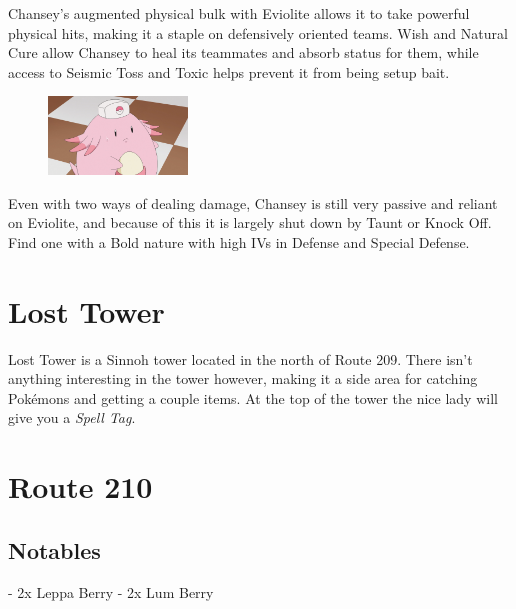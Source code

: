 \documentclass[11pt]{article}
\begin{document}
\begin{mdframed}[style=MyFrame,nobreak=true,frametitle={Pokemon Spotlight: Chansey}]

Chansey's augmented physical bulk with Eviolite allows it to take powerful physical hits,
making it a staple on defensively oriented teams.
Wish and Natural Cure allow Chansey to heal its teammates and absorb status for them,
while access to Seismic Toss and Toxic helps prevent it from being setup bait.

\begin{figure}
\includegraphics[width=0.33\textwidth]{walkthrough/Sinnoh/spotlight-chansey}
\label{fig:spotlight-chansey}
\end{figure}

Even with two ways of dealing damage, Chansey is still very passive and reliant on
Eviolite, and because of this it is largely shut down by Taunt or Knock Off.
Find one with a Bold nature with high IVs in Defense and Special Defense.

\end{mdframed}

\section{Lost Tower}\label{sec:Lost_Tower}

Lost Tower is a Sinnoh tower located in the north of Route 209.
There isn’t anything interesting in the tower however,
making it a side area for catching Pokémons and getting a couple items.
At the top of the tower the nice lady will give you a \emph{Spell Tag}.



\section{Route 210}\label{sec:Route_210}

\subsection{Notables}\label{subsec:notables-route-210}
- 2x Leppa Berry
- 2x Lum Berry
\end{document}
